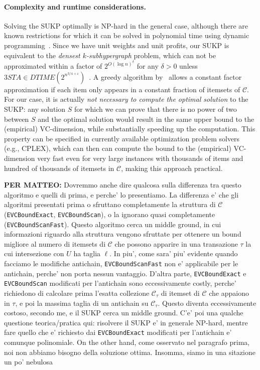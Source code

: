 \paragraph{Complexity and runtime considerations.} Solving the SUKP optimally
is NP-hard in the general case, although there are known restrictions for which
it can be solved in polynomial time using dynamic
programming~\citep{GoldschmidtNY94}. Since we have unit weights and unit
profits, our SUKP is equivalent to the \emph{densest $k$-subhypergraph} problem,
which can not be approximated within a factor of $2^{O(\log n)^\delta}$ for any
$\delta>0$ unless $3STA \in
DTIME(2^{n^{3/4+\varepsilon}})$~\citep{HajiaghayiJKLMRSV06}. A greedy algorithm
by~\citet{Arulselvan14} allows a constant factor approximation if each item only
appears in a constant fraction of itemsets of $\mathcal{C}$. For our case, it is
actually \emph{not necessary to compute the optimal solution} to the SUKP: any
solution $S$ for which we can prove that there is no power of two
between $S$ and the optimal solution would result in the same upper
bound to the (empirical) VC-dimension, while substantially speeding up the
computation. This property can be specified in currently available optimization
problem solvers (e.g., CPLEX), which can then can compute the bound to the
(empirical) VC-dimension very fast even for very large instances with thousands
of items and hundred of thousands of itemsets in $\mathcal{C}$, making this
approach practical.

{\bf PER MATTEO:} Dovremmo anche dire qualcosa sulla differenza tra questo
algoritmo e quelli di prima, e perche' lo presentiamo. La differenza e' che gli
algoritmi presentati prima o sfruttano completamente la struttura di
$\mathcal{C}$ (\texttt{EVCBoundExact}, \texttt{EVCBoundScan}), o la ignorano
quasi completamente (\texttt{EVCBoundScanFast}). Questo algoritmo cerca un middle
ground, in cui informazioni riguardo alla struttura vengono sfruttate per
ottenere un bound migliore al numero di itemsets di $\mathcal{C}$ che possono
apparire in una transazione $\tau$ la cui intersezione con $U$ ha taglia $\ell$.
In piu', come sara' piu' evidente quando facciamo le modifiche antichain,
\texttt{EVCBoundScanFast} non e' applicabile per le antichain, perche' non porta
nessun vantaggio. D'altra parte, \texttt{EVCBoundExact} e \texttt{EVCBoundScan}
modificati per l'antichain sono eccessivamente costly, perche' richiedono di
calcolare prima l'esatta collezione $\mathcal{C}_\tau$ di itemset di
$\mathcal{C}$ che appaiono in $\tau$, e poi la massima taglia di un antichain su
$\mathcal{C}_\tau$. Questo diventa eccessivamente costoso, secondo me, e il SUKP
cerca un middle ground.  C'e' poi una qualche questione teorica/pratica qui:
risolvere il SUKP e' in generale NP-hard, mentre fare quello che e' richiesto
dai \texttt{EVCBoundExact} modificati per l'antichain e' comunque polinomiale.
On the other hand, come osservato nel paragrafo prima, noi non abbiamo bisogno
della soluzione ottima. Insomma, siamo in una sitazione un po' nebulosa
